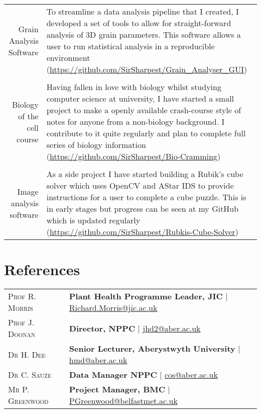 \documentclass[a4paper,10pt]{article}
\begin{document}
\begin{tabular}{r|p{10cm}}

  Grain Analysis Software  & To streamline a data analysis pipeline that I created, I developed a set of tools to allow for straight-forward analysis of 3D grain parameters. This software allows a user to run statistical analysis in a reproducible environment (\href{https://github.com/SirSharpest/Grain\_Analyser\_GUI}{https://github.com/SirSharpest/Grain\_Analyser\_GUI})\\
\\
  Biology of the cell course & Having fallen in love with biology whilst studying computer science at university, I have started a small project to make a openly available crash-course style of notes for anyone from a non-biology background. I contribute to it quite regularly and plan to complete full series of biology information (\href{https://github.com/SirSharpest/Bio-Cramming}{https://github.com/SirSharpest/Bio-Cramming})\\
  \\
  Image analysis software& As a side project I have started building a Rubik's cube solver which uses OpenCV and AStar IDS to provide instructions for a user to complete a cube puzzle. This is in early stages but progress can be seen at my GitHub which is updated regularly (\href{https://github.com/SirSharpest/Rubkis-Cube-Solver}{https://github.com/SirSharpest/Rubkis-Cube-Solver})
\end{tabular}

\section{References}
\begin{tabular}{ll}
  \textsc{Prof R. Morris} & \textbf{Plant Health Programme Leader, JIC
} | \href{Richard.Morris@jic.ac.uk}{Richard.Morris@jic.ac.uk}
  \\
  \textsc{Prof J. Doonan} & \textbf{Director, NPPC} | \href{jhd2@aber.ac.uk}{jhd2@aber.ac.uk}
  \\
  \textsc{Dr H. Dee} & \textbf{Senior Lecturer, Aberystwyth University} | \href{hmd@aber.ac.uk}{hmd@aber.ac.uk}
  \\
  \textsc{Dr C. Sauze} & \textbf{Data Manager NPPC} | \href{cos@aber.ac.uk}{cos@aber.ac.uk}
\\
  \textsc{Mr P. Greenwood} & \textbf{Project Manager, BMC} | \href{PGreenwood@belfastmet.ac.uk}{PGreenwood@belfastmet.ac.uk}
  \\
\end{tabular}
\end{document}
